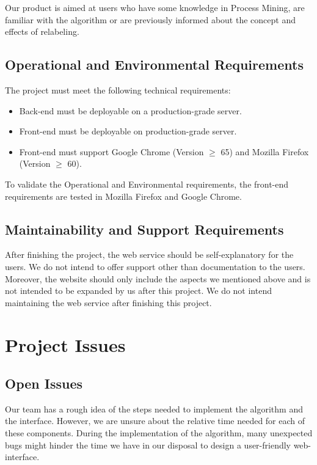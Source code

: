 \documentclass[notitlepage]{article}
\begin{document}
\begin{flushleft}
Our product is aimed at users who have some knowledge in Process Mining, are familiar with the algorithm or are previously informed about the concept and effects of relabeling.





\subsection{Operational and Environmental Requirements}
The project must meet the following technical requirements:
\medskip
\begin{itemize}
	\item Back-end must be deployable on a production-grade server.
	\item Front-end must be deployable on production-grade server.
	\item Front-end must support Google Chrome (Version $\geq$ 65) and Mozilla Firefox (Version $\geq$ 60).
\end{itemize}
\medskip
To validate the Operational and Environmental requirements, the front-end requirements are tested in Mozilla Firefox and Google Chrome. 
\subsection{Maintainability and Support Requirements}
After finishing the project, the web service should be self-explanatory for the users. We do not intend to offer support other than documentation to the users. Moreover, the website should only include the aspects we mentioned above and is not intended to be expanded by us after this project. We do not intend maintaining the web service after finishing this project.
\section{Project Issues}

\subsection{Open Issues}
Our team has a rough idea of the steps needed to implement the algorithm and the interface.
However, we are unsure about the relative time needed for each of these components.
During the implementation of the algorithm, many unexpected bugs might hinder the time we have in our disposal to design a user-friendly web-interface.


\end{flushleft}
\end{document}
